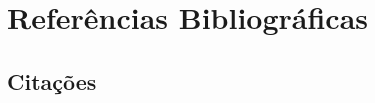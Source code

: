 \section{Referências Bibliográficas}\label{sec:referencias}

\subsection{Citações}\label{sec:citacoes}


